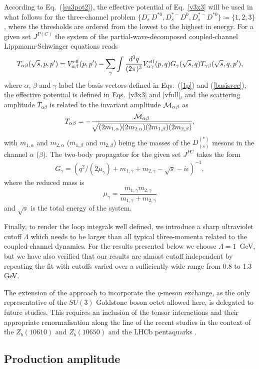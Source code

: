\documentclass[preprint,12pt,3p]{elsarticle}
\newcommand{\be}{\begin{equation}}
\newcommand{\ee}{\end{equation}}
\newcommand{\bea}{\begin{eqnarray}}
\newcommand{\eea}{\end{eqnarray}}
\begin{document}
According to Eq.~(\ref{su3pot2}), the effective potential of Eq.~\eqref{v3x3} will be used in what follows for the three-channel problem 
$\{D_s^-D^{*0},D^{*-}_s D^0,D^{*-}_sD^{*0}\}\coloneqq \{1,2,3\}$, where the thresholds are ordered from the lowest to the highest in energy. 
For a given set $J^{P(C)}$ the system of the partial-wave-decomposed coupled-channel Lippmann-Schwinger equations reads
\be
T_{\alpha\beta}(\sqrt{s},p,p')=V^{\rm eff}_{\alpha\beta}(p,p')-\sum_\gamma \int \frac{d^3q}{(2\pi)^3} V^{\rm eff}_{\alpha\gamma}(p,q){G_\gamma(\sqrt{s},q)}T_{\gamma\beta}(\sqrt{s},q,p'),
\label{Eq:JPC}
\ee
where $\alpha$, $\beta$ and $\gamma$ label the basis vectors defined in Eqs.~(\ref{1p}) and (\ref{basisvec}), the effective potential is defined in Eqs.~\eqref{v3x3} and \eqref{vfull},
and the scattering amplitude $T_{\alpha\beta}$ is related to the invariant amplitude ${\cal M}_{\alpha\beta}$ as
\bea
T_{\alpha\beta}=-\frac{{\cal M_{\alpha\beta}}}{\sqrt{(2m_{1,\alpha})(2m_{2,\alpha})(2m_{1,\beta})(2m_{2,\beta})}},
\eea
with $m_{1,\alpha}$ and $m_{2,\alpha}$ ($m_{1,\beta}$ and $m_{2,\beta}$) being the masses of the $D_{(s)}^{(*)}$ mesons in the channel $\alpha$ ($\beta$).
The two-body propagator for the given set $J^{PC}$ takes the form 
\bea
G_\gamma=\left(q^2/(2\mu_\gamma)+m_{1,\gamma}+m_{2,\gamma}-\sqrt{s}-i\epsilon\right)^{-1},
\eea
where the reduced mass is
\be
\mu_\gamma=\frac{m_{1,\gamma}m_{2,\gamma}}{m_{1,\gamma}+m_{2,\gamma}}
\ee
and $\sqrt{s}$ is the total energy of the system.

Finally, to render the loop integrals well defined, we introduce a sharp ultraviolet cutoff $\Lambda$ which needs to be larger than all
typical three-momenta related to the coupled-channel dynamics. For the results presented below we choose $\Lambda=1$~GeV, but we have also
verified that our results are almost cutoff independent by repeating the fit with cutoffs varied over a sufficiently wide range from 0.8 to 1.3 GeV.

The extension of the approach to incorporate the $\eta$-meson exchange, as the only representative of the $SU(3)$ Goldstone boson octet allowed here, 
is delegated to future studies. This requires an inclusion of the tensor interactions and their appropriate renormalisation along the line of the recent studies in the context of the $Z_b(10610)$ and $Z_b(10650)$ \cite{Wang:2018jlv,Baru:2019xnh} and the LHCb pentaquarks \cite{Du:2021fmf}.

\subsection{Production amplitude}
\end{document}
